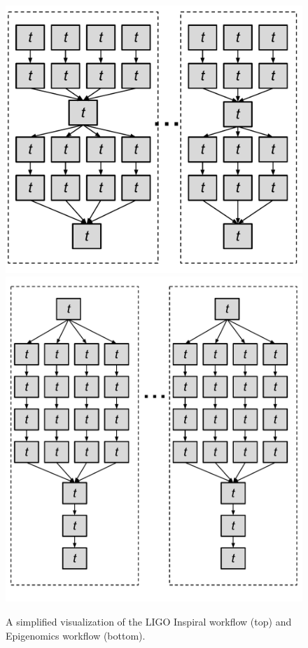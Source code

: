
\begin{figure}[htb]
	\centering
	\includegraphics[width=0.6\linewidth]{figures/imbalance/shape_of_inspiral.pdf} \\
	\includegraphics[width=0.7\linewidth]{figures/imbalance/shape_of_genome.pdf}
	\caption{A simplified visualization of the LIGO Inspiral workflow (top) and Epigenomics workflow (bottom).}
	\label{fig:imbalance_shape}
\end{figure}

